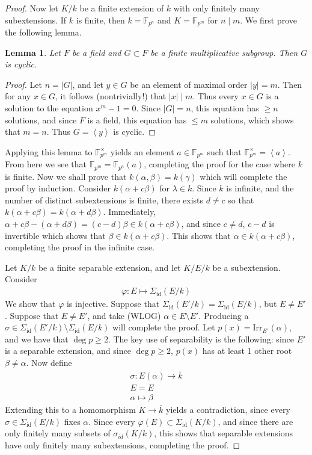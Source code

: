 \documentclass[12pt]{article}
\newtheorem{lemma}{Lemma}
\theoremstyle{definitionstyle}
\def\mbb#1{\mathbb{#1}}
\def \cph{\varphi}
\newcommand{\gen}[1]{\left\langle #1 \right\rangle}
\newcommand{\F}{\mbb F}
\begin{document}
\begin{proof}
		Now let $K/k$ be a finite extension of $k$ with only finitely many subextensions. If $k$ is finite, then $k = \F_{p^n}$ and $K = \F_{p^m}$ for $n \mid m$. We first prove the following lemma.
		\begin{lemma}
			Let $F$ be a field and $G \subset F$ be a finite multiplicative subgroup. Then $G$ is cyclic.
		\end{lemma}
		\begin{proof}
			Let $n = |G|$, and let $y \in G$ be an element of maximal order $|y| = m$. Then for any $x \in G$, it follows (nontrivially!) that $|x| \mid m$. Thus every $x \in G$ is a solution to the equation $x^m - 1 = 0$. Since $|G| = n$, this equation has $\geq n$ solutions, and since $F$ is a field, this equation has $\leq m$ solutions, which shows that $m = n$. Thus $G = \gen{y}$ is cyclic.
		\end{proof}
		Applying this lemma to $\F_{p^m}^\times$ yields an element $a \in \F_{p^m}$ such that $\F_{p^m}^\times = \gen{a}$. From here we see that $\F_{p^m} = \F_{p^n}(a)$, completing the proof for the case where $k$ is finite. Now we shall prove that $k(\alpha, \beta) = k(\gamma)$ which will complete the proof by induction. Consider $k(\alpha + c \beta)$ for $\lambda \in k$. Since $k$ is infinite, and the number of distinct subextensions is finite, there exists $d \neq c$ so that $k(\alpha + c\beta) = k(\alpha + d\beta)$. Immediately, $\alpha + c\beta - (\alpha + d\beta) = (c-d)\beta \in k(\alpha + c\beta)$, and since $c \neq d$, $c-d$ is invertible which shows that $\beta \in k(\alpha + c\beta)$. This shows that $\alpha \in k(\alpha + c\beta)$, completing the proof in the infinite case.
		
		Let $K/k$ be a finite separable extension, and let $K/E/k$ be a subextension. Consider
		\begin{align*}
			\cph: E \mapsto \Sigma_{\text{id}}(E/k)
		\end{align*}
		We show that $\cph$ is injective. Suppose that $\Sigma_{\text{id}}(E'/k) = \Sigma_{\text{id}}(E/k)$, but $E \neq E'$. Suppose that $E \neq E'$, and take (WLOG) $\alpha \in E \setminus E'$. Producing a $\sigma \in \Sigma_{\text{id}}(E'/k) \setminus \Sigma_{\text{id}}(E/k)$ will complete the proof. Let $p(x) = \mathrm{Irr}_{E'}(\alpha)$, and we have that $\deg p \geq 2$. The key use of separability is the following: since $E'$ is a separable extension, and since $\deg p \geq 2$, $p(x)$ has at least 1 other root $\beta \neq \alpha$. Now define
		\begin{align*}
			\sigma: E(\alpha) \to \overline k \\
			E = E \\
			\alpha \mapsto \beta
		\end{align*}
		Extending this to a homomorphism $K \to \overline k$ yields a contradiction, since every $\sigma \in \Sigma_{\text{id}}(E/k)$ fixes $\alpha$. Since every $\cph(E) \subset \Sigma_{\text{id}}(K/k)$, and since there are only finitely many subsets of $\sigma_{id}(K/k)$, this shows that separable extensions have only finitely many subextensions, completing the proof.
	\end{proof}
\end{document}
